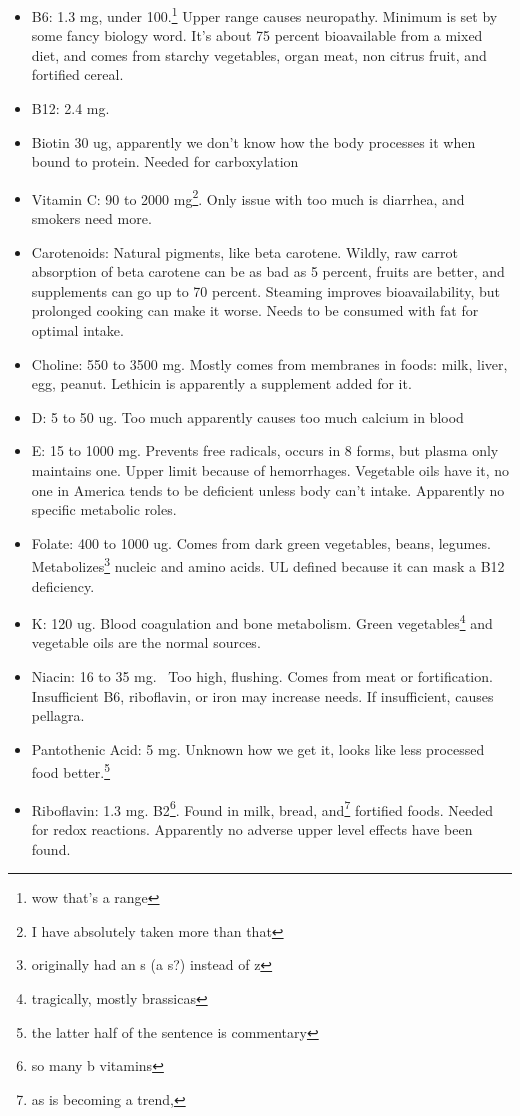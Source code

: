 \documentclass[12pt]{article}[titlepage]
\renewcommand{\,}{\textsuperscript{,}}
\begin{document}
\begin{itemize}
\begin{itemize}
\item B6: 1.3 mg, under 100.\footnote{wow that's a range} Upper range causes neuropathy. Minimum is set by some fancy biology word. It's about 75 percent bioavailable from a mixed diet, and comes from starchy vegetables, organ meat, non citrus fruit, and fortified cereal.  
\item B12: 2.4 mg.  
\item Biotin 30 ug, apparently we don't know how the body processes it when bound to protein. Needed for carboxylation  
\item Vitamin C: 90 to 2000 mg\footnote{I have absolutely taken more than that}. Only issue with too much is diarrhea, and smokers need more.  
\item Carotenoids: Natural pigments, like beta carotene. Wildly, raw carrot absorption of beta carotene can be as bad as 5 percent, fruits are better, and supplements can go up to 70 percent. Steaming improves bioavailability, but prolonged cooking can make it worse.  
Needs to be consumed with fat for optimal intake.  
\item Choline: 550 to 3500 mg. Mostly comes from membranes in foods: milk, liver, egg, peanut. Lethicin is apparently a supplement added for it.  
\item D: 5 to 50 ug. Too much apparently causes too much calcium in blood  
\item E: 15 to 1000 mg. Prevents free radicals, occurs in 8 forms, but plasma only maintains one. Upper limit because of hemorrhages. Vegetable oils have it, no one in America tends to be deficient unless body can't intake.  
Apparently no specific metabolic roles.  
\item Folate: 400 to 1000 ug. Comes from dark green vegetables, beans, legumes. Metabolizes\footnote{originally had an s (a s?) instead of z} nucleic and amino acids. UL defined because it can mask a B12 deficiency.  
\item K: 120 ug. Blood coagulation and bone metabolism. Green vegetables\footnote{tragically, mostly brassicas} and vegetable oils are the normal sources.  
\item Niacin: 16 to 35 mg.  Too high, flushing. Comes from meat or fortification. Insufficient B6, riboflavin, or iron may increase needs. If insufficient, causes pellagra.  
\item Pantothenic Acid: 5 mg. Unknown how we get it, looks like less processed food better.\footnote{the latter half of the sentence is commentary}  
\item Riboflavin: 1.3 mg. B2\footnote{so many b vitamins}. Found in milk, bread, and\footnote{as is becoming a trend,} fortified foods. Needed for redox reactions. Apparently no adverse upper level effects have been found.  

\end{itemize}
\end{itemize}
\end{document}
